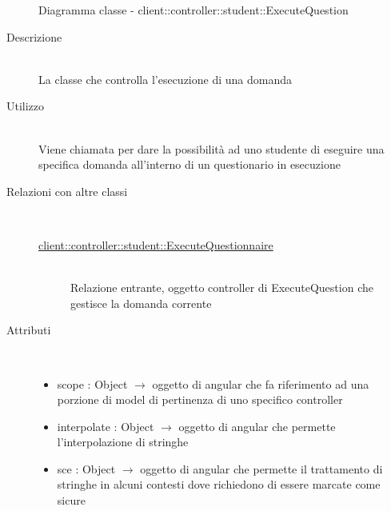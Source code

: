 \begin{figure}[H]
	\centering
	\caption{Diagramma classe - client::controller::student::ExecuteQuestion}
\end{figure}\begin{description}
\item[Descrizione] \hfill \\
La classe che controlla l'esecuzione di una domanda 
\item[Utilizzo] \hfill \\
Viene chiamata per dare la possibilità ad uno studente di eseguire una specifica domanda all'interno di un questionario in esecuzione
\item[Relazioni con altre classi] \hfill \\
\vspace{-7mm}
\begin{description}
	\item[\hyperlink{client::controller::student::ExecuteQuestionnaire}{client::controller::student::ExecuteQuestionnaire}] \hfill \\
	Relazione entrante, oggetto controller di ExecuteQuestion che gestisce la domanda corrente
\end{description}

\item[Attributi] \hfill \\
\vspace{-7mm}
\begin{itemize}
	\item scope : Object $\rightarrow$ oggetto di angular che fa riferimento ad una porzione di model di pertinenza di uno specifico controller
	\item interpolate : Object $\rightarrow$ oggetto di angular che permette l'interpolazione di stringhe
	\item sce : Object $\rightarrow$ oggetto di angular che permette il trattamento di stringhe in alcuni contesti dove richiedono di essere marcate come sicure
\end{itemize}


\end{description}
